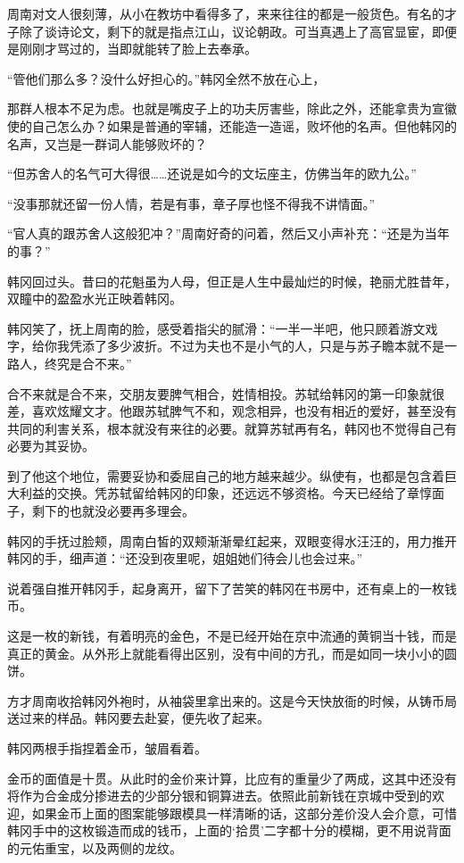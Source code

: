 周南对文人很刻薄，从小在教坊中看得多了，来来往往的都是一般货色。有名的才子除了谈诗论文，剩下的就是指点江山，议论朝政。可当真遇上了高官显宦，即便是刚刚才骂过的，当即就能转了脸上去奉承。

“管他们那么多？没什么好担心的。”韩冈全然不放在心上，

那群人根本不足为虑。也就是嘴皮子上的功夫厉害些，除此之外，还能拿贵为宣徽使的自己怎么办？如果是普通的宰辅，还能造一造谣，败坏他的名声。但他韩冈的名声，又岂是一群词人能够败坏的？

“但苏舍人的名气可大得很……还说是如今的文坛座主，仿佛当年的欧九公。”

“没事那就还留一份人情，若是有事，章子厚也怪不得我不讲情面。”

“官人真的跟苏舍人这般犯冲？”周南好奇的问着，然后又小声补充：“还是为当年的事？”

韩冈回过头。昔曰的花魁虽为人母，但正是人生中最灿烂的时候，艳丽尤胜昔年，双瞳中的盈盈水光正映着韩冈。

韩冈笑了，抚上周南的脸，感受着指尖的腻滑：“一半一半吧，他只顾着游文戏字，给你我凭添了多少波折。不过为夫也不是小气的人，只是与苏子瞻本就不是一路人，终究是合不来。”

合不来就是合不来，交朋友要脾气相合，姓情相投。苏轼给韩冈的第一印象就很差，喜欢炫耀文才。他跟苏轼脾气不和，观念相异，也没有相近的爱好，甚至没有共同的利害关系，根本就没有来往的必要。就算苏轼再有名，韩冈也不觉得自己有必要为其妥协。

到了他这个地位，需要妥协和委屈自己的地方越来越少。纵使有，也都是包含着巨大利益的交换。凭苏轼留给韩冈的印象，还远远不够资格。今天已经给了章惇面子，剩下的也就没必要再多理会。

韩冈的手抚过脸颊，周南白皙的双颊渐渐晕红起来，双眼变得水汪汪的，用力推开韩冈的手，细声道：“还没到夜里呢，姐姐她们待会儿也会过来。”

说着强自推开韩冈手，起身离开，留下了苦笑的韩冈在书房中，还有桌上的一枚钱币。

这是一枚的新钱，有着明亮的金色，不是已经开始在京中流通的黄铜当十钱，而是真正的黄金。从外形上就能看得出区别，没有中间的方孔，而是如同一块小小的圆饼。

方才周南收拾韩冈外袍时，从袖袋里拿出来的。这是今天快放衙的时候，从铸币局送过来的样品。韩冈要去赴宴，便先收了起来。

韩冈两根手指捏着金币，皱眉看着。

金币的面值是十贯。从此时的金价来计算，比应有的重量少了两成，这其中还没有将作为合金成分掺进去的少部分银和铜算进去。依照此前新钱在京城中受到的欢迎，如果金币上面的图案能够跟模具一样清晰的话，这部分差价没人会介意，可惜韩冈手中的这枚锻造而成的钱币，上面的‘拾贯’二字都十分的模糊，更不用说背面的元佑重宝，以及两侧的龙纹。

